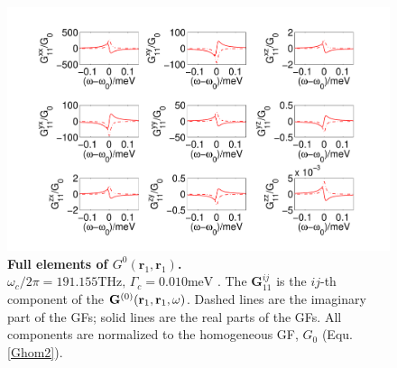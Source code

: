 \begin{figure}[H]
\centering
\begin{center}
\includegraphics[width=16cm]{./Figs/G84_11_2}
\end{center}
\caption[Full elements of $G^0(\mathbf{r}_1,\mathbf{r}_1)$.]{\textbf{Full elements of $G^0(\mathbf{r}_1,\mathbf{r}_1)$. $\omega_c/2\pi = 191.155 {\text {THz}},\, \Gamma_c = 0.010 {\text {meV}}$ }. The $\mathbf{G}^{ij}_{11}$ is the $ij$-th component of the $\mathbf{G}^{(0)}(\mathbf{r}_1,\mathbf{r}_1,\omega)$. Dashed lines are the imaginary part of the GFs; solid lines are the real parts of the GFs. All components are normalized to the homogeneous GF, $G_0$ (Equ.\eqref{Ghom2}).}
\label{G84_11_2}
\end{figure}


